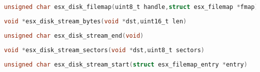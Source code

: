 \documentclass[11pt]{book}
\def\lthtmlcheckvsize{\ifdim\ht\sizebox<\vsize 
  \ifdim\wd\sizebox<\hsize\expandafter\hfill\fi \expandafter\vfill
  \else\expandafter\vss\fi}%
\begin{document}
{\newpage\clearpage
{}%
\begin{table}\centering
  
\end{table}%
\lthtmlfigureZ
\lthtmlcheckvsize\clearpage}

{\newpage\clearpage
{}%
\begin{table}\centering
  
\end{table}%
\lthtmlfigureZ
\lthtmlcheckvsize\clearpage}

{\newpage\clearpage
{}%
\begin{table}\centering
  
\end{table}%
\lthtmlfigureZ
\lthtmlcheckvsize\clearpage}

{\newpage\clearpage
{}%
\begin{lstlisting}[language=C]
unsigned char esx_disk_filemap(uint8_t handle,struct esx_filemap *fmap)
\end{lstlisting}%
\lthtmlfigureZ
\lthtmlcheckvsize\clearpage}

{\newpage\clearpage
{}%
\begin{lstlisting}[language=C]
void *esx_disk_stream_bytes(void *dst,uint16_t len)
\end{lstlisting}%
\lthtmlfigureZ
\lthtmlcheckvsize\clearpage}

{\newpage\clearpage
{}%
\begin{lstlisting}[language=C]
unsigned char esx_disk_stream_end(void)
\end{lstlisting}%
\lthtmlfigureZ
\lthtmlcheckvsize\clearpage}

{\newpage\clearpage
{}%
\begin{lstlisting}[language=C]
void *esx_disk_stream_sectors(void *dst,uint8_t sectors)
\end{lstlisting}%
\lthtmlfigureZ
\lthtmlcheckvsize\clearpage}

{\newpage\clearpage
{}%
\begin{lstlisting}[language=C]
unsigned char esx_disk_stream_start(struct esx_filemap_entry *entry)
\end{lstlisting}%
\lthtmlfigureZ
\lthtmlcheckvsize\clearpage}
\end{document}
